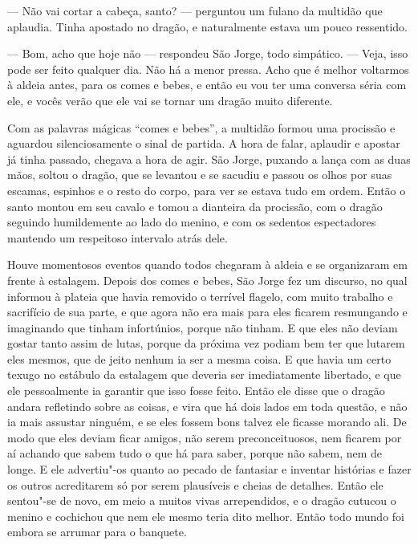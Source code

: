 --- Não vai cortar a cabeça, santo? --- perguntou um fulano da multidão
que aplaudia. Tinha apostado no dragão, e naturalmente estava um
pouco ressentido.

--- Bom, acho que hoje não --- respondeu São Jorge, todo simpático. ---
Veja, isso pode ser feito qualquer dia. Não há a menor pressa. Acho
que é melhor voltarmos à aldeia antes, para os comes e bebes, e então
eu vou ter uma conversa séria com ele, e vocês verão que ele vai se
tornar um dragão muito diferente.

Com as palavras mágicas “comes e bebes”, a multidão formou uma procissão
e aguardou silenciosamente o sinal de partida. A hora de falar,
aplaudir e apostar já tinha passado, chegava a hora de agir. São
Jorge, puxando a lança com as duas mãos, soltou o dragão, que se
levantou e se sacudiu e passou os olhos por suas escamas, espinhos e
o resto do corpo, para ver se estava tudo em ordem. Então o santo montou em
seu cavalo e tomou a dianteira da procissão, com o dragão seguindo
humildemente ao lado do menino, e com os sedentos espectadores
mantendo um respeitoso intervalo atrás dele.

Houve momentosos eventos quando todos chegaram à aldeia e se
organizaram em frente à estalagem. Depois dos comes e bebes, São
Jorge fez um discurso, no qual informou à plateia que havia removido
o terrível flagelo, com muito trabalho e sacrifício de sua parte, e
que agora não era mais para eles ficarem resmungando e imaginando que
tinham infortúnios, porque não tinham. E que eles não deviam gostar
tanto assim de lutas, porque da próxima vez podiam bem ter que
lutarem eles mesmos, que de jeito nenhum ia ser a mesma coisa. E que
havia um certo texugo no estábulo da estalagem que deveria ser
imediatamente libertado, e que ele pessoalmente ia garantir que isso
fosse feito. Então ele disse que o dragão andara refletindo sobre as
coisas, e vira que há dois lados em toda questão, e não ia mais assustar
ninguém, e se eles fossem bons talvez ele ficasse morando ali. De modo
que eles deviam ficar amigos, não serem preconceituosos, nem ficarem
por aí achando que sabem tudo o que há para saber, porque não sabem,
nem de longe. E ele advertiu"-os quanto ao pecado de fantasiar e
inventar histórias e fazer os outros acreditarem só por serem
plausíveis e cheias de detalhes. Então ele sentou"-se de novo, em meio
a muitos vivas arrependidos, e o dragão cutucou o menino e cochichou
que nem ele mesmo teria dito melhor. Então todo mundo foi embora se
arrumar para o banquete.


